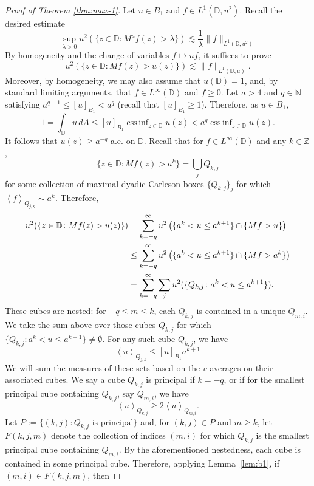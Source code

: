 \documentclass{amsart}
\newcommand{\avg}[1]{\left\langle {#1}\right\rangle}
\theoremstyle{definition}
\numberwithin{equation}{section}
\begin{document}
\begin{proof}[Proof of Theorem \ref{thm:max-1}]
    Let $u \in B_1$ and $f \in L^1(\mathbb{D},u^2)$. Recall the desired estimate
    \[
        \sup_{\lambda > 0} u^2(\{z \in \mathbb{D} \colon M^uf(z) > \lambda \}) \lesssim \frac{1}{\lambda}\|f\|_{L^1(\mathbb{D},u^2)}
    \]
    By homogeneity and the change of variables $f \mapsto uf$, it suffices to prove
    \[
        u^2(\{z \in \mathbb{D} \colon Mf(z) > u(z)\}) \lesssim \|f\|_{L^1(\mathbb{D},u)}.
    \]
    Moreover, by homogeneity, we may also assume that $u(\mathbb{D}) = 1$, and, by standard limiting arguments, that $f \in L^\infty(\mathbb{D})$ and $f \ge 0$. Let $a > 4$ and $q \in \mathbb{N}$ satisfying $a^{q-1} \le [u]_{B_1} < a^q$ (recall that $[u]_{B_1} \ge 1$). Therefore, as $u \in B_1$,
    \[
        1 = \int_\mathbb{D}u\,dA \le [u]_{B_1}\operatorname{ess\,inf}_{z \in \mathbb{D}} u(z) < a^q\operatorname{ess\,inf}_{z \in \mathbb{D}}u(z).
    \]
    It follows that $u(z) \ge a^{-q}$ a.e. on $\mathbb{D}$. Recall that for $f \in L^\infty(\mathbb{D})$ and any $k \in \mathbb Z$,
    \[
        \{z \in \mathbb{D} \colon Mf(z) > a^k \} = \bigcup_{j}Q_{k,j}
    \]
    for some collection of maximal dyadic Carleson boxes $\{Q_{k,j}\}_j$ for which $\avg{f}_{Q_{j,k}} \sim a^k$. Therefore, 
    \begin{align}
        \notag u^2(\{z \in \mathbb{D} \colon Mf(z) > u(z) \}) 
        &= \sum_{k = -q}^\infty u^2\left(\{ a^k < u \le a^{k+1}\} \cap \{ Mf > u \}\right)\\
        \notag &\le \sum_{k = -q}^\infty u^2\left(\{ a^k < u \le a^{k+1}\} \cap \{ Mf > a^k \}\right)\\
        &= \sum_{k = -q}^\infty \sum_{j}u^2(\{Q_{k,j} \colon a^k < u \le a^{k+1}\}). \label{e:B1-step-1}
    \end{align}
   These cubes are nested: for $-q \le m \le k$, each $Q_{k,j}$ is contained in a unique $Q_{m,i}$. We take the sum above over those cubes $Q_{k,j}$ for which $\{Q_{k,j} \colon a^k < u \le a^{k+1}\} \neq \emptyset$. For any such cube $Q_{k,j}$, we have
    \begin{equation}\label{e:avg_est}
        \avg{u}_{Q_{j,k}} \le [u]_{B_1} a^{k+1}
    \end{equation}
    We will sum the measures of these sets based on the $v$-averages on their associated cubes. We say a cube $Q_{k,j}$ is principal if $k = -q$, or if for the smallest principal cube containing $Q_{k,j}$, say $Q_{m,i}$, we have
    \[
        \avg{u}_{Q_{k,j}} \ge 2 \avg{u}_{Q_{m,i}}.
    \]
    Let $P := \{(k,j) \colon Q_{k,j} \text{ is principal}\}$ and, for $(k,j) \in P$ and $m \ge k$, let $F(k,j,m)$ denote the collection of indices $(m,i)$ for which $Q_{k,j}$ is the smallest principal cube containing $Q_{m,i}$. By the aforementioned nestedness, each cube is contained in some principal cube. Therefore, applying Lemma~\ref{lem:b1}, if $(m,i) \in F(k,j,m)$, then

\end{proof}
\end{document}
